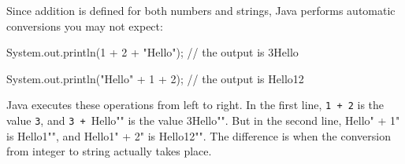 \documentclass[12pt]{book}
\makeatletter
\theoremstyle{exercise}
\newcommand{\java}[1]{\verb"#1"}
\renewcommand{\section}{\@startsection {section}{1}{\z@}%
    {-3.5ex \@plus -1ex \@minus -.2ex}%
    {0.7ex \@plus.2ex}%
    {\normalfont\Large\bfseries}}
\newcommand{\java}[1]{\lstinline{#1}} %
\makeatother
\begin{document}

Since addition is defined for both numbers and strings, Java performs automatic conversions you may not expect:


\begin{code}
    System.out.println(1 + 2 + "Hello");
    // the output is 3Hello

    System.out.println("Hello" + 1 + 2);
    // the output is Hello12
\end{code}

Java executes these operations from left to right.
In the first line, \java{1 + 2} is the value \java{3}, and \java{3 + "Hello"} is the value \java{"3Hello"}.
But in the second line, \java{"Hello" + 1} is \java{"Hello1"}, and \java{"Hello1" + 2} is \java{"Hello12"}.
The difference is when the conversion from integer to string actually takes place.

%





\end{document}
